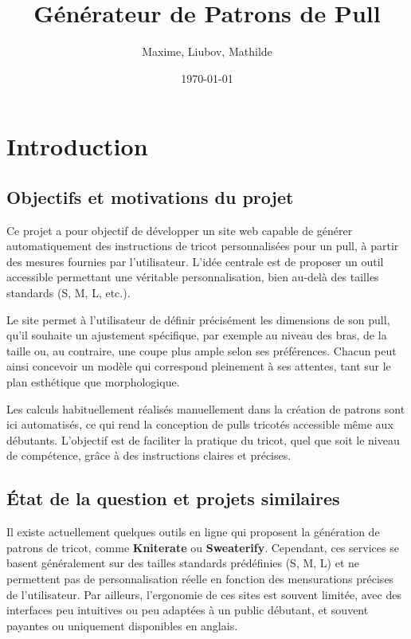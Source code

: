 \documentclass{article}
\title{Générateur de Patrons de Pull}
\author{Maxime, Liubov, Mathilde}
\date{\today}
\begin{document}
\maketitle
\clearpage
\tableofcontents
\clearpage

\section{Introduction}
\subsection{Objectifs et motivations du projet}

Ce projet a pour objectif de développer un site web capable de générer automatiquement des instructions de tricot personnalisées pour un pull, à partir des mesures fournies par l’utilisateur. L'idée centrale est de proposer un outil accessible permettant une véritable personnalisation, bien au-delà des tailles standards (S, M, L, etc.).

Le site permet à l’utilisateur de définir précisément les dimensions de son pull, qu’il souhaite un ajustement spécifique, par exemple au niveau des bras, de la taille ou, au contraire, une coupe plus ample selon ses préférences. Chacun peut ainsi concevoir un modèle qui correspond pleinement à ses attentes, tant sur le plan esthétique que morphologique.

Les calculs habituellement réalisés manuellement dans la création de patrons sont ici automatisés, ce qui rend la conception de pulls tricotés accessible même aux débutants. L’objectif est de faciliter la pratique du tricot, quel que soit le niveau de compétence, grâce à des instructions claires et précises.

\subsection{État de la question et projets similaires}
Il existe actuellement quelques outils en ligne qui proposent la génération de patrons de tricot, comme \textbf{Kniterate} ou \textbf{Sweaterify}. Cependant, ces services se basent généralement sur des tailles standards prédéfinies (S, M, L) et ne permettent pas de personnalisation réelle en fonction des mensurations précises de l’utilisateur. Par ailleurs, l’ergonomie de ces sites est souvent limitée, avec des interfaces peu intuitives ou peu adaptées à un public débutant, et souvent payantes ou uniquement disponibles en anglais.
\end{document}
